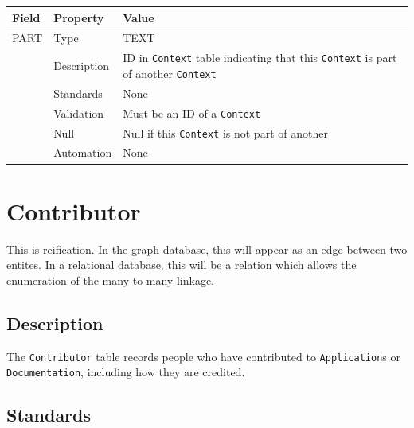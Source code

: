 \documentclass[
]{article}
\newcounter{none} %
\begin{document}
{\def\LTcaptype{none} %
\begin{longtable}[]{@{}
  >{\raggedright\arraybackslash}p{}
  >{\raggedright\arraybackslash}p{}
  >{\raggedright\arraybackslash}p{}@{}}
\toprule\noalign{}
\begin{minipage}[b]{\linewidth}\raggedright
Field
\end{minipage} & \begin{minipage}[b]{\linewidth}\raggedright
Property
\end{minipage} & \begin{minipage}[b]{\linewidth}\raggedright
Value
\end{minipage} \\
\midrule\noalign{}
\endhead
\bottomrule\noalign{}
\endlastfoot
PART & Type & TEXT \\
& Description & ID in \texttt{Context} table indicating that this
\texttt{Context} is part of another \texttt{Context} \\
& Standards & None \\
& Validation & Must be an ID of a \texttt{Context} \\
& Null & Null if this \texttt{Context} is not part of another \\
& Automation & None \\
\end{longtable}
}

\section{Contributor}\label{contributor}

This is reification. In the graph database, this will appear as an edge
between two entites. In a relational database, this will be a relation
which allows the enumeration of the many-to-many linkage.

\subsection{Description}\label{description-9}

The \texttt{Contributor} table records people who have contributed to
\texttt{Application}s or \texttt{Documentation}, including how they are
credited.

\subsection{Standards}\label{standards-11}
\end{document}

